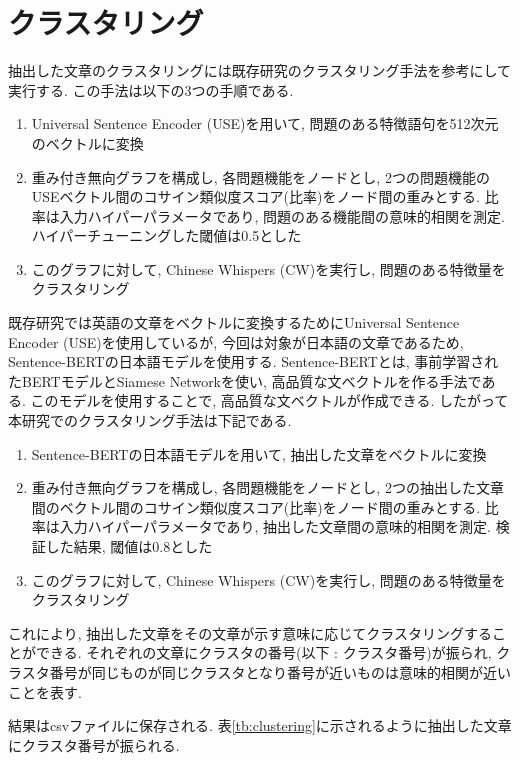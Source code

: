 \section{クラスタリング}
抽出した文章のクラスタリングには既存研究のクラスタリング手法\cite{sira}を参考にして実行する. この手法は以下の3つの手順である. 
\begin{enumerate}
  \item Universal Sentence Encoder (USE)を用いて, 問題のある特徴語句を512次元のベクトルに変換
  \item 重み付き無向グラフを構成し, 各問題機能をノードとし, 2つの問題機能のUSEベクトル間のコサイン類似度スコア(比率)をノード間の重みとする. 比率は入力ハイパーパラメータであり, 問題のある機能間の意味的相関を測定. ハイパーチューニングした閾値は0.5とした
  \item このグラフに対して, Chinese Whispers (CW)を実行し, 問題のある特徴量をクラスタリング
\end{enumerate}

既存研究では英語の文章をベクトルに変換するためにUniversal Sentence Encoder (USE)を使用しているが, 今回は対象が日本語の文章であるため, Sentence-BERTの日本語モデルを使用する. Sentence-BERTとは, 事前学習されたBERTモデルとSiamese Networkを使い, 高品質な文ベクトルを作る手法である. このモデルを使用することで, 高品質な文ベクトルが作成できる. 
したがって本研究でのクラスタリング手法は下記である. 
\begin{enumerate}
  \item Sentence-BERTの日本語モデルを用いて, 抽出した文章をベクトルに変換
  \item 重み付き無向グラフを構成し, 各問題機能をノードとし, 2つの抽出した文章間のベクトル間のコサイン類似度スコア(比率)をノード間の重みとする. 比率は入力ハイパーパラメータであり, 抽出した文章間の意味的相関を測定. 検証した結果, 閾値は0.8とした
  \item このグラフに対して, Chinese Whispers (CW)を実行し, 問題のある特徴量をクラスタリング
\end{enumerate}

これにより, 抽出した文章をその文章が示す意味に応じてクラスタリングすることができる. それぞれの文章にクラスタの番号(以下 : クラスタ番号)が振られ, クラスタ番号が同じものが同じクラスタとなり番号が近いものは意味的相関が近いことを表す. 

結果はcsvファイルに保存される. 表\ref{tb:clustering}に示されるように抽出した文章にクラスタ番号が振られる. 

